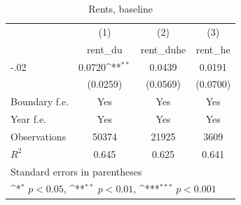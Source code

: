\begin{table}[htbp]\centering
\def\sym#1{\ifmmode^{#1}\else\(^{#1}\)\fi}
\caption{Rents, baseline}
\begin{tabular}{l*{3}{c}}
\hline\hline
                    &\multicolumn{1}{c}{(1)}&\multicolumn{1}{c}{(2)}&\multicolumn{1}{c}{(3)}\\
                    &\multicolumn{1}{c}{rent\_du}&\multicolumn{1}{c}{rent\_duhe}&\multicolumn{1}{c}{rent\_he}\\
\hline
-.02                &      0.0720\sym{**} &      0.0439         &      0.0191         \\
                    &    (0.0259)         &    (0.0569)         &    (0.0700)         \\
[1em]
Boundary f.e.       &         Yes         &         Yes         &         Yes         \\
[1em]
Year f.e.           &         Yes         &         Yes         &         Yes         \\
\hline
Observations        &       50374         &       21925         &        3609         \\
\(R^{2}\)           &       0.645         &       0.625         &       0.641         \\
\hline\hline
\multicolumn{4}{l}{\footnotesize Standard errors in parentheses}\\
\multicolumn{4}{l}{\footnotesize \sym{*} \(p<0.05\), \sym{**} \(p<0.01\), \sym{***} \(p<0.001\)}\\
\end{tabular}
\end{table}

